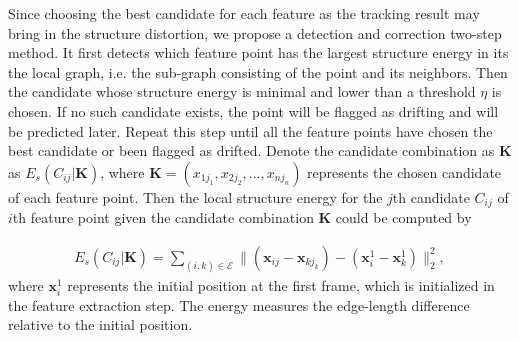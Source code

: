 Since choosing the best candidate for each feature as the tracking result may bring in the structure distortion, we propose a detection and correction two-step method. It first detects which feature point has the largest structure energy in its the local graph, i.e. the sub-graph consisting of the point and its neighbors. Then the candidate whose structure energy is minimal and lower than a threshold $ \eta $ is chosen. If no such candidate exists, the point will be flagged as drifting and will be predicted later. Repeat this step until all the feature points have chosen the best candidate or been flagged as drifted. 
Denote the candidate combination as $ \mathbf{K} $ as $ E_s(C_{ij}|\mathbf{K}) $, where $ \mathbf{K} = (x_{1j_1}, x_{2j_2},\ldots, x_{nj_n}) $ represents the chosen candidate of each feature point.
Then the local structure energy for the $ j $th candidate $ C_{ij} $ of $ i $th feature point given the candidate combination $ \mathbf{K} $ could be computed by 

\begin{align}\label{eq:structure_energy}
E_s(C_{ij}|\mathbf{K}) = \sum_{(i, k) \in \mathcal{E}} \|(\mathbf{x}_{ij} -  \mathbf{x}_{kj_k}) - (\mathbf{x}^1_{i} -  \mathbf{x}^1_{k}) \|^2_2,
\end{align}
where $ \mathbf{x}^1_i $ represents the initial position at the first frame, which is initialized in the feature extraction step. The energy measures the edge-length difference relative to the initial position.

%
%


